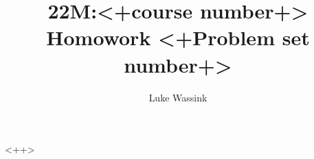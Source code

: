 \documentclass{article}
\title{22M:<+course number+> Homowork <+Problem set number+>}
\author{Luke Wassink}
\date{}
\begin{document}
\maketitle




<++>
\end{document}
